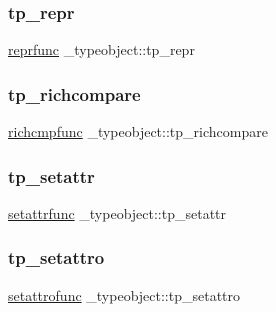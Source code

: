 \subsubsection{\texorpdfstring{tp\_repr}{tp\_repr}}
{\footnotesize\ttfamily \mbox{\hyperlink{_python27_2object_8h_a880e8271f8f3f984e0baecc0255c312f}{reprfunc}} \+\_\+typeobject\+::tp\+\_\+repr}

\mbox{\label{struct__typeobject_a0a30eadd156f1369bb7fdbbdf5e6cd37}} 
\subsubsection{\texorpdfstring{tp\_richcompare}{tp\_richcompare}}
{\footnotesize\ttfamily \mbox{\hyperlink{_python27_2object_8h_a34e21b7b63def5f9f5deaf89840f587a}{richcmpfunc}} \+\_\+typeobject\+::tp\+\_\+richcompare}

\mbox{\label{struct__typeobject_a83b13e804c97dd0941b6531cfd501640}} 
\subsubsection{\texorpdfstring{tp\_setattr}{tp\_setattr}}
{\footnotesize\ttfamily \mbox{\hyperlink{_python27_2object_8h_a5d61fb429f16948d39f999466b5e99dd}{setattrfunc}} \+\_\+typeobject\+::tp\+\_\+setattr}

\mbox{\label{struct__typeobject_a34bf7e4e5555b7569a07d538ad65910a}} 
\subsubsection{\texorpdfstring{tp\_setattro}{tp\_setattro}}
{\footnotesize\ttfamily \mbox{\hyperlink{_python27_2object_8h_a05938baec67b23931030056e9a8c3e1f}{setattrofunc}} \+\_\+typeobject\+::tp\+\_\+setattro}

\mbox{\label{struct__typeobject_a186e058ba8d2ad3dfe6f503f40a05909}} 
